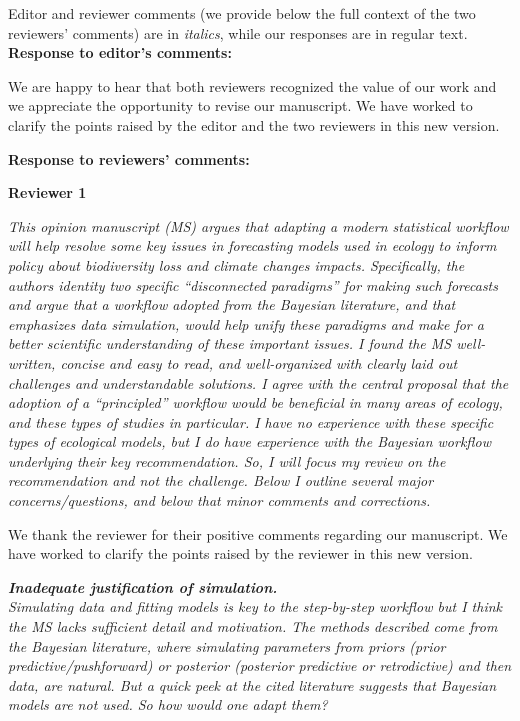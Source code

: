 \documentclass[11pt,letter]{article}
\begin{document}
\setlength{\parindent}{0cm}
\setlength{\parskip}{7pt}

Editor and reviewer comments (we provide below the full context of the two reviewers' comments) are in \emph{italics}, while our responses are in regular text. \\ 

{\bf Response to editor's comments:} 

We are happy to hear that both reviewers recognized the value of our work and we appreciate the opportunity to revise our manuscript. We have worked to clarify the points raised by the editor and the two reviewers in this new version.

{\bf Response to reviewers' comments:} 

{\bf Reviewer 1}

\begin{mybox}
\emph{This opinion manuscript (MS) argues that adapting a modern statistical workflow will help resolve some key issues in forecasting models used in ecology to inform policy about biodiversity loss and climate changes impacts. Specifically, the authors identity two specific “disconnected paradigms” for making such forecasts and argue that a workflow adopted from the Bayesian literature, and that emphasizes data simulation, would help unify these paradigms and make for a better scientific understanding of these important issues. I found the MS well-written, concise and easy to read, and well-organized with clearly laid out challenges and understandable solutions. I agree with the central proposal that the adoption of a “principled” workflow would be beneficial in many areas of ecology, and these types of studies in particular. I have no experience with these specific types of ecological models, but I do have experience with the Bayesian workflow underlying their key recommendation. So, I will focus my review on the recommendation and not the challenge. Below I outline several major concerns/questions, and below that minor comments and corrections.}
\end{mybox}

We thank the reviewer for their positive comments regarding our manuscript. 
We have worked to clarify the points raised by the reviewer in this new version.

\begin{mybox}
\emph{\textbf{Inadequate justification of simulation.}\\
Simulating data and fitting models is key to the step-by-step workflow but I think the MS lacks sufficient detail and motivation. The methods described come from the Bayesian literature, where simulating parameters from priors (prior predictive/pushforward) or posterior (posterior predictive or retrodictive) and then data, are natural. But a quick peek at the cited literature suggests that Bayesian models are not used. So how would one adapt them?}
\end{mybox}
\end{document}

